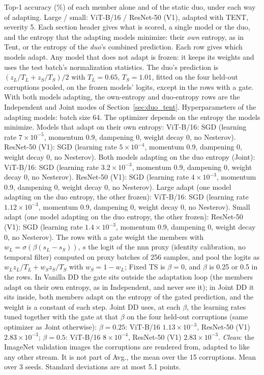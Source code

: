 \begin{table}[t]
    \centering
    \small
    \setlength{\tabcolsep}{3.5pt}
    \caption{Top-1 accuracy (\%) of each member alone and of the static duo, under each way of adapting. Large / small: ViT-B/16 / ResNet-50 (V1), adapted with TENT, severity 5. Each section header gives what is scored, a single model or the duo, and the entropy that the adapting models minimize: their \emph{own} entropy, as in Tent, or the entropy of the \emph{duo}'s combined prediction. Each row gives which models adapt. Any model that does not adapt is frozen: it keeps its weights and uses the test batch's normalization statistics. The duo's prediction is $(z_L / T_L + z_S / T_S) / 2$ with $T_L = 0.65$, $T_S = 1.01$, fitted on the four held-out corruptions pooled, on the frozen models' logits, except in the rows with a gate. With both models adapting, the own-entropy and duo-entropy rows are the Independent and Joint modes of Section~\ref{sec:duo_tent}. Hyperparameters of the adapting models: batch size 64. The optimizer depends on the entropy the models minimize. Models that adapt on their own entropy: ViT-B/16: SGD (learning rate $7 \times 10^{-5}$, momentum 0.9, dampening 0, weight decay 0, no Nesterov). ResNet-50 (V1): SGD (learning rate $5 \times 10^{-4}$, momentum 0.9, dampening 0, weight decay 0, no Nesterov). Both models adapting on the duo entropy (Joint): ViT-B/16: SGD (learning rate $3.2 \times 10^{-3}$, momentum 0.9, dampening 0, weight decay 0, no Nesterov). ResNet-50 (V1): SGD (learning rate $4 \times 10^{-3}$, momentum 0.9, dampening 0, weight decay 0, no Nesterov). Large adapt (one model adapting on the duo entropy, the other frozen): ViT-B/16: SGD (learning rate $1.12 \times 10^{-3}$, momentum 0.9, dampening 0, weight decay 0, no Nesterov). Small adapt (one model adapting on the duo entropy, the other frozen): ResNet-50 (V1): SGD (learning rate $1.4 \times 10^{-3}$, momentum 0.9, dampening 0, weight decay 0, no Nesterov). The rows with a gate weight the members with $w_L = \sigma(\beta (s_L - s_S))$, $s$ the logit of the nnn proxy (identity calibration, no temporal filter) computed on proxy batches of 256 samples, and pool the logits as $w_L z_L / T_L + w_S z_S / T_S$ with $w_S = 1 - w_L$; Fixed TS is $\beta = 0$, and $\beta$ is 0.25 or 0.5 in the rows. In Vanilla DD the gate sits outside the adaptation loop (the members adapt on their own entropy, as in Independent, and never see it); in Joint DD it sits inside, both members adapt on the entropy of the gated prediction, and the weight is a constant of each step. Joint DD uses, at each $\beta$, the learning rates tuned together with the gate at that $\beta$ on the four held-out corruptions (same optimizer as Joint otherwise): $\beta = 0.25$: ViT-B/16 $1.13 \times 10^{-3}$, ResNet-50 (V1) $2.83 \times 10^{-3}$; $\beta = 0.5$: ViT-B/16 $8 \times 10^{-4}$, ResNet-50 (V1) $2.83 \times 10^{-3}$. \emph{Clean}: the ImageNet validation images the corruptions are rendered from, adapted to like any other stream. It is not part of Avg., the mean over the 15 corruptions. Mean over 3 seeds. Standard deviations are at most 5.1 points.}

\end{table}
